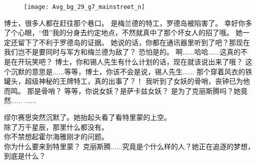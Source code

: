 \documentclass[openany]{book}
\begin{document}
\begin{dialogue}
    \begin{figure}[h]
        \centering
        \texttt{[image: Avg\_bg\_29\_g7\_mainstreet\_n]}
    \end{figure}
     博士，很多人都在赶往那个巷口。
     是梅兰德的特工，罗德岛被陷害了。
     幸好你多了个心眼，“借”我的分身去约定地点，不然就真中了那个坏女人的招了哦。
     她一定还留下了不利于罗德岛的证据。
     她说的话，你都在通讯器里听到了吧？那现在我们岂不是要同时与军方和梅兰德为敌了？
     恐怕是的。
     啊......哈哈......这真的不是在开玩笑吧？
     博士，你和锡人先生有什么计划的话，现在就该说出来了哦？
     这个沉默的意思是......等等，博士，你该不会是说，锡人先生......
     那个穿着风衣的铁罐头，超级神秘的王牌特工，真的出事了？！
     我听到了女妖的骨哨，丧钟已为他而鸣。
     那是骨哨？
     等等，你说女妖？是萨卡兹女妖？
     是为了克丽斯腾吗？她竟然......
     ......\par
    缪尔赛思突然沉默了。她抬起头看了看特里蒙的上空。\\
    除了万千星辰，那里什么都没有。\\
    你不禁想起霍尔海雅刚才的问题。\\
    你为什么要来到特里蒙？
     克丽斯腾......究竟是个什么样的人？她正在追逐的梦想，到底是什么？
\end{dialogue}
\end{document}
